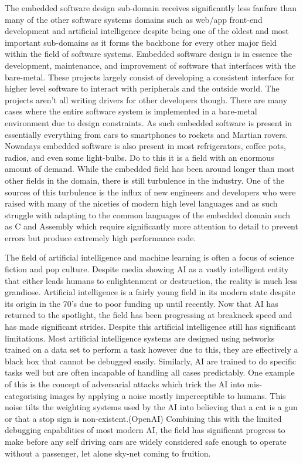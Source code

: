 \documentclass[12pt,letterpaper,titlepage]{report}
\begin{document}
\begin{raggedright}
The embedded software design sub-domain receives significantly less fanfare than many of the other software systems domains such as web/app front-end development and artificial intelligence despite being one of the oldest and most important sub-domains as it forms the backbone for every other major field within the field of software systems. Embedded software design is in essence the development, maintenance, and improvement of software that interfaces with the bare-metal. These projects largely consist of developing a consistent interface for higher level software to interact with peripherals and the outside world. The projects aren't all writing drivers for other developers though. There are many cases where the entire software system is implemented in a bare-metal environment due to design constraints. As such embedded software is present in essentially everything from cars to smartphones to rockets and Martian rovers. Nowadays embedded software is also present in most refrigerators, coffee pots, radios, and even some light-bulbs. Do to this it is a field with an enormous amount of demand. While the embedded field has been around longer than most other fields in the domain, there is still turbulence in the industry. One of the sources of this turbulence is the influx of new engineers and developers who were raised with many of the niceties of modern high level languages and as such struggle with adapting to the common languages of the embedded domain such as C and Assembly which require significantly more attention to detail to prevent errors but produce extremely high performance code.

The field of artificial intelligence and machine learning is often a focus of science fiction and pop culture. Despite media showing AI as a vastly intelligent entity that either leads humans to enlightenment or destruction, the reality is much less grandiose. Artificial intelligence is a fairly young field in its modern state despite its origin in the 70's due to poor funding up until recently. Now that AI has returned to the spotlight, the field has been progressing at breakneck speed and has made significant strides. Despite this artificial intelligence still has significant limitations. Most artificial intelligence systems are designed using networks trained on a data set to perform a task however due to this, they are effectively a black box that cannot be debugged easily. Similarly, AI are trained to do specific tasks well but are often incapable of handling all cases predictably. One example of this is the concept of adversarial attacks which trick the AI into mis-categorising images by applying a noise mostly imperceptible to humans. This noise tilts the weighting systems used by the AI into believing that a cat is a gun or that a stop sign is non-existent.(OpenAI) Combining this with the limited debugging capabilities of most modern AI, the field has significant progress to make before any self driving cars are widely considered safe enough to operate without a passenger, let alone sky-net coming to fruition.


\end{raggedright}
\end{document}
